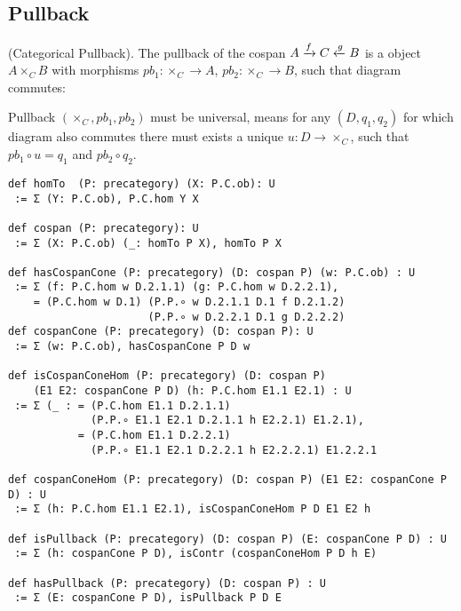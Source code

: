 \documentclass{article}
\begin{document}
\newpage
\subsection{Pullback}

\begin{definition} (Categorical Pullback).
The pullback of the cospan $A \xrightarrow{{f}} C \xleftarrow{{g}} B$ is a object $A \times_{C} B$ with
morphisms $pb_1 : \times_C \rightarrow A $, $pb_2 : \times_C \rightarrow B$, such that
diagram commutes:
\begin{center}
\end{center}
Pullback $(\times_C,pb_1,pb_2)$ must be universal, means for any $(D,q_1,q_2)$
for which diagram also commutes there must exists a unique $u: D \rightarrow \times_C$,
such that $pb_1 \circ u = q_1$ and $pb_2 \circ q_2$.
\begin{lstlisting}
def homTo  (P: precategory) (X: P.C.ob): U
 := Σ (Y: P.C.ob), P.C.hom Y X

def cospan (P: precategory): U
 := Σ (X: P.C.ob) (_: homTo P X), homTo P X

def hasCospanCone (P: precategory) (D: cospan P) (w: P.C.ob) : U
 := Σ (f: P.C.hom w D.2.1.1) (g: P.C.hom w D.2.2.1),
    = (P.C.hom w D.1) (P.P.∘ w D.2.1.1 D.1 f D.2.1.2)
                      (P.P.∘ w D.2.2.1 D.1 g D.2.2.2)
def cospanCone (P: precategory) (D: cospan P): U
 := Σ (w: P.C.ob), hasCospanCone P D w

def isCospanConeHom (P: precategory) (D: cospan P)
    (E1 E2: cospanCone P D) (h: P.C.hom E1.1 E2.1) : U
 := Σ (_ : = (P.C.hom E1.1 D.2.1.1)
             (P.P.∘ E1.1 E2.1 D.2.1.1 h E2.2.1) E1.2.1),
           = (P.C.hom E1.1 D.2.2.1)
             (P.P.∘ E1.1 E2.1 D.2.2.1 h E2.2.2.1) E1.2.2.1

def cospanConeHom (P: precategory) (D: cospan P) (E1 E2: cospanCone P D) : U
 := Σ (h: P.C.hom E1.1 E2.1), isCospanConeHom P D E1 E2 h

def isPullback (P: precategory) (D: cospan P) (E: cospanCone P D) : U
 := Σ (h: cospanCone P D), isContr (cospanConeHom P D h E)

def hasPullback (P: precategory) (D: cospan P) : U
 := Σ (E: cospanCone P D), isPullback P D E
\end{lstlisting}
\end{definition}
\end{document}
